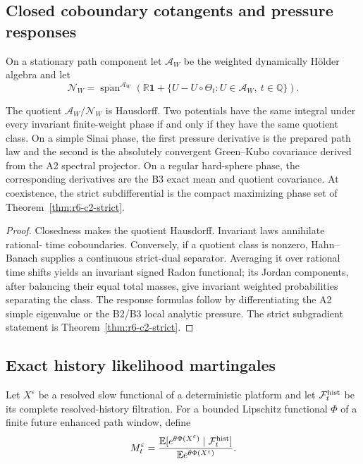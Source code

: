 \subsection{Closed coboundary cotangents and pressure responses}

On a stationary path component let \(\mathscr A_W\) be the weighted
dynamically Hölder algebra and let
\[
\mathscr N_W=\overline{\operatorname{span}}^{\mathscr A_W}
\left(
\mathbb R\mathbf1+
\{U-U\circ\Theta_t:U\in\mathscr A_W,\ t\in\mathbb Q\}
\right).
\]

\begin{theorem}
\label{thm:r6-c2-cotangent}
The quotient \(\mathscr A_W/\mathscr N_W\) is Hausdorff.  Two potentials have
the same integral under every invariant finite-weight phase if and only if
they have the same quotient class.  On a simple Sinai phase, the first
pressure derivative is the prepared path law and the second is the absolutely
convergent Green--Kubo covariance derived from the A2 spectral projector.  On
a regular hard-sphere phase, the corresponding derivatives are the B3 exact
mean and quotient covariance.  At coexistence, the strict subdifferential is
the compact maximizing phase set of
Theorem~\ref{thm:r6-c2-strict}.
\end{theorem}

\begin{proof}
Closedness makes the quotient Hausdorff.  Invariant laws annihilate rational-
time coboundaries.  Conversely, if a quotient class is nonzero, Hahn--Banach
supplies a continuous strict-dual separator.  Averaging it over rational time
shifts yields an invariant signed Radon functional; its Jordan components,
after balancing their equal total masses, give invariant weighted
probabilities separating the class.  The response formulas follow by
differentiating the A2 simple eigenvalue or the B2/B3 local analytic pressure.
The strict subgradient statement is
Theorem~\ref{thm:r6-c2-strict}.
\end{proof}

\subsection{Exact history likelihood martingales}

Let \(X^\varepsilon\) be a resolved slow functional of a deterministic
platform and let \(\mathcal F_t^{\rm hist}\) be its complete resolved-history
filtration.  For a bounded Lipschitz functional \(\Phi\) of a finite future
enhanced path window, define
\[
M_t^\varepsilon=
\frac{
\mathbb E[e^{\theta\Phi(X^\varepsilon)}\mid
\mathcal F_t^{\rm hist}]
}{
\mathbb E e^{\theta\Phi(X^\varepsilon)}
}.
\]


